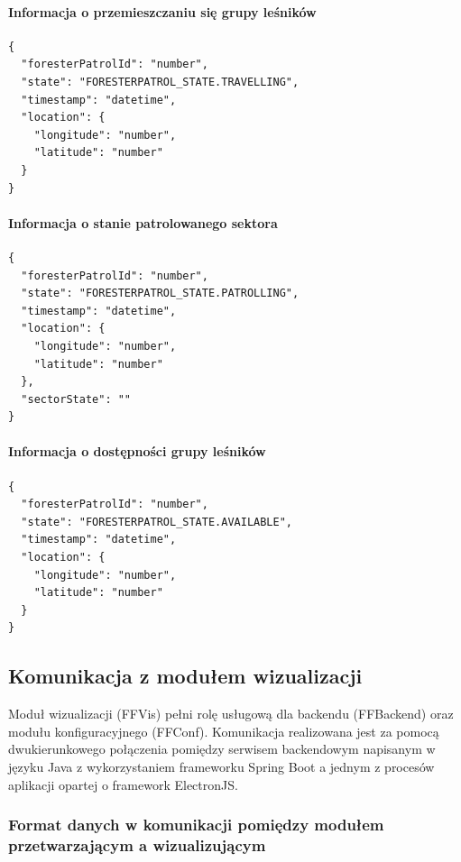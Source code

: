 \documentclass[11pt,a4paper]{article}
\begin{document}
\paragraph{Informacja o przemieszczaniu się grupy leśników}

\begin{verbatim}
{
  "foresterPatrolId": "number",
  "state": "FORESTERPATROL_STATE.TRAVELLING",
  "timestamp": "datetime",
  "location": {
    "longitude": "number",
    "latitude": "number"
  }
}
\end{verbatim}

\paragraph{Informacja o stanie patrolowanego sektora}

\begin{verbatim}
{
  "foresterPatrolId": "number",
  "state": "FORESTERPATROL_STATE.PATROLLING",
  "timestamp": "datetime",
  "location": {
    "longitude": "number",
    "latitude": "number"
  },
  "sectorState": ""
}
\end{verbatim}

\paragraph{Informacja o dostępności grupy leśników}

\begin{verbatim}
{
  "foresterPatrolId": "number",
  "state": "FORESTERPATROL_STATE.AVAILABLE",
  "timestamp": "datetime",
  "location": {
    "longitude": "number",
    "latitude": "number"
  }
}
\end{verbatim}

\subsection{Komunikacja z modułem wizualizacji}

Moduł wizualizacji (FFVis) pełni rolę usługową dla backendu (FFBackend) oraz modułu konfiguracyjnego (FFConf). Komunikacja realizowana jest za pomocą dwukierunkowego połączenia pomiędzy serwisem backendowym napisanym w języku Java z wykorzystaniem frameworku Spring Boot a jednym z procesów aplikacji opartej o framework ElectronJS.

\subsubsection{Format danych w komunikacji pomiędzy modułem przetwarzającym a wizualizującym}
\end{document}
